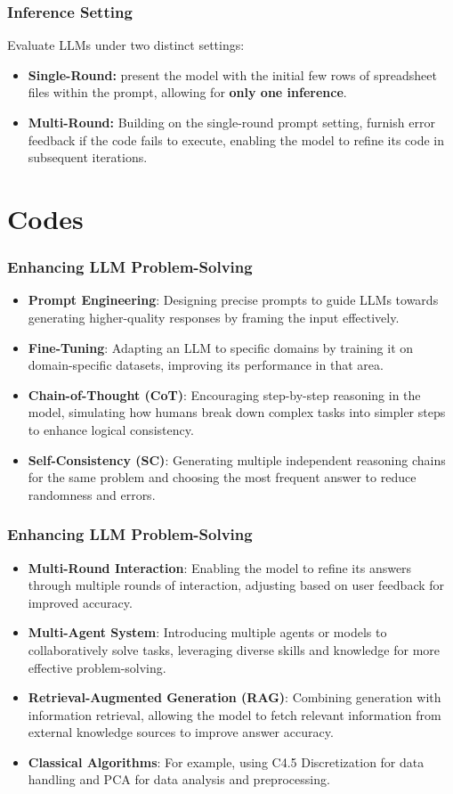 \documentclass{beamer}
\begin{document}
\begin{frame}
    \frametitle{Inference Setting}
    Evaluate LLMs under two distinct settings:
    \begin{itemize}
        \item \textbf{Single-Round:} present the model with the initial few rows of spreadsheet files within the prompt, allowing for \textbf{only one inference}.
        \item \textbf{Multi-Round:} Building on the single-round prompt setting, furnish error feedback if the code fails to execute, enabling the model to refine its code in subsequent iterations.
    \end{itemize}
\end{frame}

\section{Codes}

\begin{frame}
    \frametitle{Enhancing LLM Problem-Solving}
    \begin{itemize}
        \item \textbf{Prompt Engineering}: Designing precise prompts to guide LLMs towards generating higher-quality responses by framing the input effectively.
        \item \textbf{Fine-Tuning}: Adapting an LLM to specific domains by training it on domain-specific datasets, improving its performance in that area.
        \item \textbf{Chain-of-Thought (CoT)}: Encouraging step-by-step reasoning in the model, simulating how humans break down complex tasks into simpler steps to enhance logical consistency.
        \item \textbf{Self-Consistency (SC)}: Generating multiple independent reasoning chains for the same problem and choosing the most frequent answer to reduce randomness and errors.
    \end{itemize}
\end{frame}

\begin{frame}
    \frametitle{Enhancing LLM Problem-Solving}
    \begin{itemize}
        \item \textbf{Multi-Round Interaction}: Enabling the model to refine its answers through multiple rounds of interaction, adjusting based on user feedback for improved accuracy.
        \item \textbf{Multi-Agent System}: Introducing multiple agents or models to collaboratively solve tasks, leveraging diverse skills and knowledge for more effective problem-solving.
        \item \textbf{Retrieval-Augmented Generation (RAG)}: Combining generation with information retrieval, allowing the model to fetch relevant information from external knowledge sources to improve answer accuracy.
        \item \textbf{Classical Algorithms}: For example, using C4.5 Discretization for data handling and PCA for data analysis and preprocessing.
    \end{itemize}
\end{frame}
\end{document}
